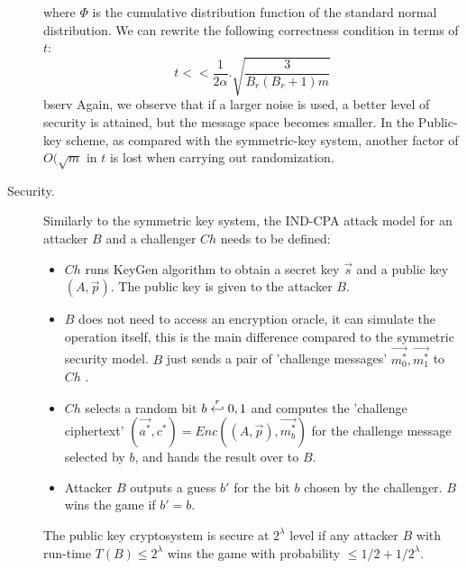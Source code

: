 \begin{description}
\[  \]
  where $\Phi$ is the cumulative distribution function of the standard normal
  distribution. We can rewrite the following correctness condition in terms of
  $t$:
  \[
    t << \frac{1}{2\alpha}.\sqrt{\frac{3}{B_r(B_r + 1)m}}
  \]
bserv  Again, we observe that if a larger noise is used, a better level of security is attained,
  but the message space becomes smaller. In the Public-key scheme, as compared with
  the symmetric-key system, another factor of $O(\sqrt{m}$ in $t$ is lost when carrying out randomization.
\item [Security.] Similarly to the symmetric key system, the
  IND-CPA attack model for an attacker $B$ and a challenger $Ch$ needs to be defined:
  \begin{itemize}
  \item $Ch$ runs KeyGen algorithm to obtain a secret key $\vec{s}$ and a public
    key $(A,\vec{p})$. The public key is given to the attacker $B$.
  \item $B$ does not need to access an encryption oracle, it can simulate the
    operation itself, this is the main difference compared to the symmetric
    security model. $B$ just sends a pair of 'challenge messages'
    $\vec{m_0^*}, \vec{m_1^*}$ to $Ch$ .
  \item $Ch$ selects a random bit $b \stackrel{r}{\hookleftarrow} {0,1}$ and computes the
    'challenge ciphertext' $(\vec{a^*}, c^*) = Enc((A, \vec{p}), \vec{m_b^*})$
    for the challenge message selected by $b$, and hands the result over to $B$.
  \item Attacker $B$ outputs a guess $b'$ for the bit $b$ chosen by the
    challenger. $B$ wins the game if $b' = b$.
  \end{itemize}
  \begin{definition}
     The public key cryptosystem is secure at
    $2^\lambda$ level if any attacker $B$ with run-time $T(B) \leq 2^\lambda$
    wins the game with probability $\leq 1/2 + 1/2^\lambda$.

    \label{def:PublicKeyIndCPARegev}
  \end{definition}


\end{description}
